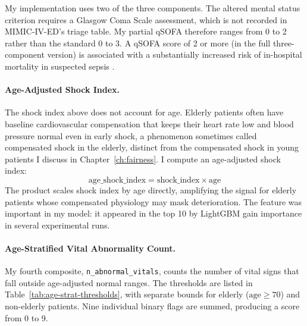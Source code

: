 My implementation uses two of the three components. The altered mental status criterion requires a Glasgow Coma Scale assessment, which is not recorded in MIMIC-IV-ED's triage table. My partial qSOFA therefore ranges from 0 to 2 rather than the standard 0 to 3. A qSOFA score of 2 or more (in the full three-component version) is associated with a substantially increased risk of in-hospital mortality in suspected sepsis \citep{seymour2016qsofa}.

\paragraph{Age-Adjusted Shock Index.} The shock index above does not account for age. Elderly patients often have baseline cardiovascular compensation that keeps their heart rate low and blood pressure normal even in early shock, a phenomenon sometimes called compensated shock in the elderly, distinct from the compensated shock in young patients I discuss in Chapter~\ref{ch:fairness}. I compute an age-adjusted shock index:
\[
\text{age\_shock\_index} = \text{shock\_index} \times \text{age}
\]
The product scales shock index by age directly, amplifying the signal for elderly patients whose compensated physiology may mask deterioration. The feature was important in my model: it appeared in the top 10 by LightGBM gain importance in several experimental runs.

\paragraph{Age-Stratified Vital Abnormality Count.} My fourth composite, \texttt{n\_abnormal\_vitals}, counts the number of vital signs that fall outside age-adjusted normal ranges. The thresholds are listed in Table~\ref{tab:age-strat-thresholds}, with separate bounds for elderly ($\text{age} \geq 70$) and non-elderly patients. Nine individual binary flags are summed, producing a score from 0 to 9.

